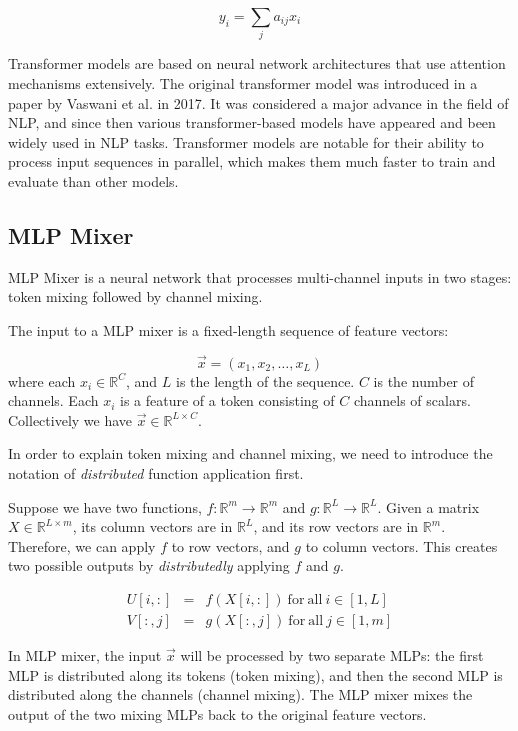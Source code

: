 $$
y_i = \sum_j a_{ij}x_i
$$

Transformer models are based on neural network architectures that use attention mechanisms extensively. The original transformer model was introduced in a paper by Vaswani et al. \cite{DBLP:journals/corr/VaswaniSPUJGKP17} in 2017. It was considered a major advance in the field of NLP, and since then various transformer-based models have appeared and been widely used in NLP tasks. Transformer models are notable for their ability to process input sequences in parallel, which makes them much faster to train and evaluate than other models.


\subsection{MLP Mixer}
\label{sec:mlp-mixer}
MLP Mixer \cite{tolstikhin2021mlp} is a neural network that processes multi-channel inputs in two stages: token mixing followed by channel mixing.

The input to a MLP mixer is a fixed-length sequence of feature vectors:

$$\vec x = (x_1, x_2, \dots, x_L)$$
where each $x_i\in\mathbb{R}^C$, and $L$ is the length of the sequence. $C$ is the number of channels.  Each $x_i$ is a feature
of a token consisting of $C$ channels of scalars.  Collectively we have $\vec x\in\mathbb{R}^{L\times C}$.

In order to explain token mixing and channel mixing, we need to introduce the notation of {\em distributed} function application first.

Suppose we have two functions, 
$f: \mathbb{R}^m\to\mathbb{R}^m$ and $g:\mathbb{R}^L\to\mathbb{R}^L$.
Given a matrix $X \in\mathbb{R}^{L\times m}$, its column vectors are in $\mathbb{R}^L$, and its row vectors are in $\mathbb{R}^m$.  Therefore, we can apply $f$ to row vectors, and $g$ to column vectors.
This creates two possible outputs by {\em distributedly} applying $f$ and $g$.

\begin{eqnarray*}
U[i, :] &=& f(X[i, :])\ \mathrm{for\ all}\ i\in[1, L] \\
V[:, j] &=& g(X[:, j])\ \mathrm{for\ all}\ j\in[1, m]
\end{eqnarray*}

In MLP mixer, the input $\vec x$ will be processed by two separate MLPs: the first MLP is distributed along
its tokens (token mixing), and then the second MLP is distributed along the channels (channel mixing).  The MLP mixer mixes the output of the two mixing MLPs back to the original feature vectors.

